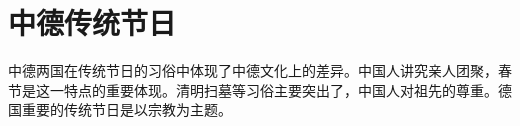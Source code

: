 \section{中德传统节日}

中德两国在传统节日的习俗中体现了中德文化上的差异。中国人讲究亲人团聚，春节是这一特点的重要体现。清明扫墓等习俗主要突出了，中国人对祖先的尊重。德国重要的传统节日是以宗教为主题。



